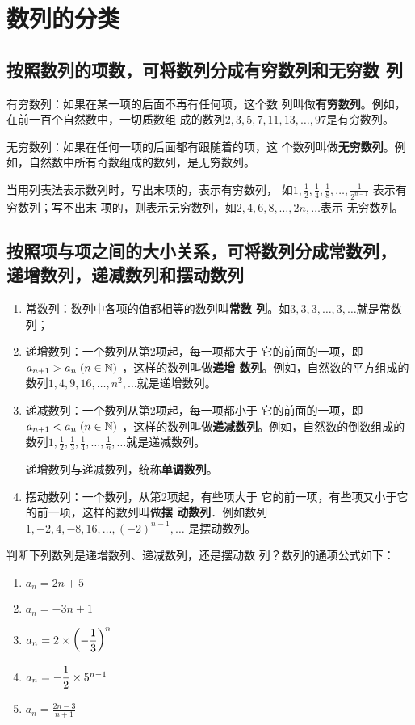 \section{数列的分类}

\subsection*{按照数列的项数，可将数列分成有穷数列和无穷数
列}

有穷数列：如果在某一项的后面不再有任何项，这个数
列叫做\textbf{有穷数列}。例如，在前一百个自然数中，一切质数组
成的数列$2,3,5,7,11,13,\ldots,97$是有穷数列。

无穷数列：如果在任何一项的后面都有跟随着的项，这
个数列叫做\textbf{无穷数列}。例如，自然数中所有奇数组成的数列，是无穷数列。

当用列表法表示数列时，写出末项的，表示有穷数列，
如$1,\frac{1}{2},\frac{1}{4},\frac{1}{8},\ldots,\frac{1}{2^{n-1}}$
表示有穷数列；写不出末
项的，则表示无穷数列，如$2,4,6,8,\ldots,2n,\ldots$表示
无穷数列。

\subsection*{按照项与项之间的大小关系，可将数列分成常数列，
递增数列，递减数列和摆动数列}

\begin{enumerate}[(1)]
\item 常数列：数列中各项的值都相等的数列叫\textbf{常数
列}。如$3,3,3,\ldots,3,\ldots$就是常数列；
\item 递增数列：一个数列从第2项起，每一项都大于
它的前面的一项，即
$a_{n+1}>a_n\; (n\in\mathbb{N})$
，这样的数列叫做\textbf{递增
数列}。例如，自然数的平方组成的数列$1,4,9,16,\ldots,
n^2,\ldots$就是递增数列。
\item 递减数列：一个数列从第2项起，每一项都小于
它的前面的一项，即
$a_{n+1}<a_n\; (n\in\mathbb{N})$
，这样的数列叫做\textbf{递减数列}。例如，自然数的倒数组成的数列$1,\frac{1}{2},\frac{1}{3},\frac{1}{4},\ldots,\frac{1}{n},\ldots$就是递减数列。

递增数列与递减数列，统称\textbf{单调数列}。

\item 摆动数列：一个数列，从第2项起，有些项大于
它的前一项，有些项又小于它的前一项，这样的数列叫做\textbf{摆
动数列}．例如数列$1,-2,4,-8,16,\ldots, (-2)^{n-1},\ldots$
是摆动数列。
\end{enumerate}

\begin{example}
    判断下列数列是递增数列、递减数列，还是摆动数
列？数列的通项公式如下：
\begin{multicols}{2}
\begin{enumerate}[(1)]
\item $a_n=2n+5$
\item $a_n=-3n+1$
\item $a_n=2\times\left(-\dfrac{1}{3}\right)^n$
\item $a_n=-\dfrac{1}{2}\times5^{n-1}$
\item $a_n=\frac{2n-3}{n+1}$
\end{enumerate}
\end{multicols}
\end{example}

